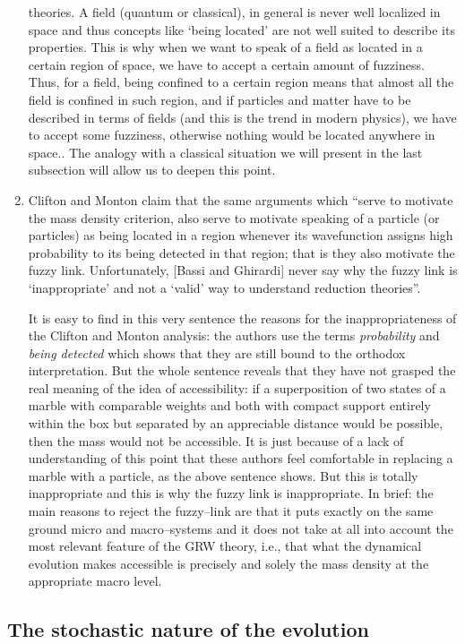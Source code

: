 \documentclass[12pt]{article}
\begin{document}
\begin{enumerate}
{theories. A field (quantum or classical), in general is never well
localized in space and thus concepts like `being located' are not
well suited to describe its properties. This is why when we want
to speak of a field as located in a certain region of space, we
have to accept a certain amount of fuzziness. Thus, for a field,
being confined to a certain region  means that almost all the
field is confined in such region, and if particles and matter have
to be described in terms of fields (and this is the trend in
modern physics), we have to accept some fuzziness, otherwise
nothing would be located anywhere in space.}. The analogy with a
classical situation we will present in the last subsection  will
allow us to deepen this point.

\item Clifton and Monton claim that the same arguments which
``serve to motivate the mass density criterion, also serve to
motivate speaking of a particle (or particles) as being located in
a region whenever its wavefunction assigns high probability to its
being detected in that region; that is they also motivate the
fuzzy link. Unfortunately, [Bassi and Ghirardi] never say why the
fuzzy link is `inappropriate' and not a `valid' way to understand
reduction theories''.

It is easy to find in this very sentence the reasons for the
inappropriateness of the Clifton and Monton analysis: the authors
use the terms {\it probability} and {\it being detected} which
shows that they are still bound to the orthodox interpretation.
But the whole sentence reveals that they have not grasped the real
meaning of the idea of accessibility: if a superposition of two
states of a marble with comparable weights and both with compact
support entirely within the box but separated by an appreciable
distance would be possible, then the mass would not be accessible.
It is just because of a lack of understanding of this point that
these authors feel comfortable in replacing a marble with a
particle, as  the above sentence shows. But this is totally
inappropriate and this is why the fuzzy link is inappropriate. In
brief: the main reasons to reject the fuzzy--link are that it puts
exactly on the same ground micro and macro--systems and it does
not take at all into account the most relevant feature of the GRW
theory, i.e., that what the dynamical evolution makes accessible
is precisely and solely the mass density at the appropriate macro level.
\end{enumerate}


\subsection{The stochastic nature of the evolution} \label{sec136}
\end{document}
